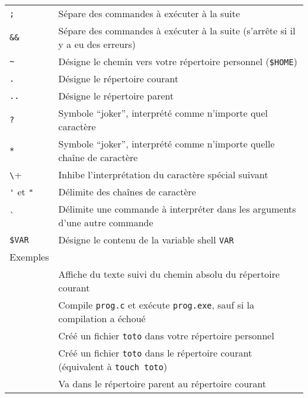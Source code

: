 \documentclass [a4paper]{article}
\begin{document}
\noindent
\begin{tabular}{ ll }
\hline
{\verb+;+}                 & Sépare des commandes à exécuter à la suite \\
{\verb+&&+}                & Sépare des commandes à exécuter à la suite (s'arrête si il y a eu des erreurs)\\
{\verb+~+}                 & Désigne le chemin vers votre répertoire personnel (\verb+$HOME+) \\
{\verb+.+}                 & Désigne le répertoire courant \\
{\verb+..+}                & Désigne le répertoire parent \\
{\verb+?+}                 & Symbole ``joker'', interprété comme \og{} n'importe quel caractère \fg{} \\
{\verb+*+}                 & Symbole ``joker'', interprété comme \og{} n'importe quelle chaîne de caractère \fg{} \\
{\verb+\+}                 & Inhibe l'interprétation du caractère spécial suivant \\
{\verb+'+ et \verb+"+}     & Délimite des chaînes de caractère \\
{\verb+`+}                 & Délimite une commande à interpréter dans les arguments d'une autre commande \\
{\verb+$VAR+}              & Désigne le contenu de la variable shell \verb+VAR+ \\
\hline
Exemples                                            &   \\
\hspace{0.5cm}{\verb+echo "Je suis dans"; pwd+}     & Affiche du texte suivi du chemin absolu du répertoire courant \\
\hspace{0.5cm}{\verb+compile prog.c && ./prog.exe+} & Compile \verb+prog.c+ et exécute \verb+prog.exe+, sauf si la compilation a échoué \\
\hspace{0.5cm}{\verb+touch ~/toto+}                 & Créé un fichier \verb+toto+ dans votre répertoire personnel \\
\hspace{0.5cm}{\verb+touch ./toto+}                 & Créé un fichier \verb+toto+ dans le répertoire courant (équivalent à \verb+touch toto+)\\
\hspace{0.5cm}{\verb+cd ..+}                        & Va dans le répertoire parent au répertoire courant\\

\end{tabular}
\end{document}
